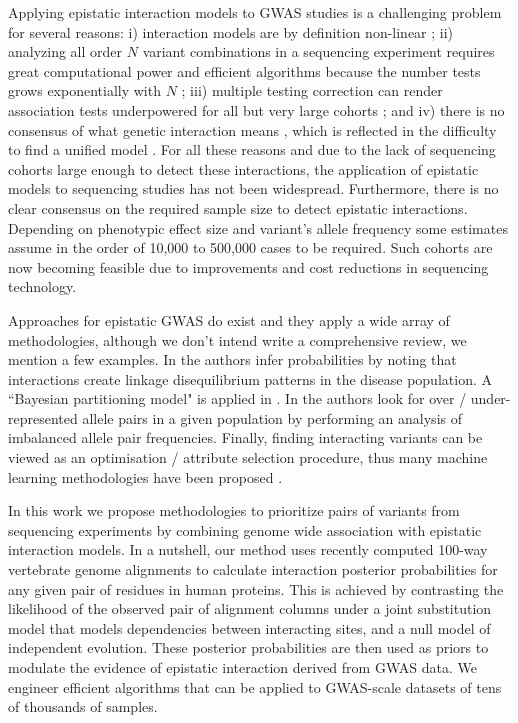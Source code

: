 Applying epistatic interaction models to GWAS studies is a challenging problem for several reasons: i) interaction models are by definition non-linear \cite{gao2010classification}; ii) analyzing all order $N$ variant combinations in a sequencing experiment requires great computational power and efficient algorithms because the number tests grows exponentially with $N$ \cite{phillips2008epistasis}; iii) multiple testing correction can render association tests underpowered for all but very large cohorts \cite{gao2010classification, phillips2008epistasis}; and iv) there is no consensus of what genetic interaction means \cite{mani2008defining}, which is reflected in the difficulty to find a unified model \cite{phillips2008epistasis,mani2008defining}. For all these reasons and due to the lack of sequencing cohorts large enough to detect these interactions, the application of epistatic models to sequencing studies has not been widespread. Furthermore, there is no clear consensus on the required sample size to detect epistatic interactions. Depending on phenotypic effect size and variant's allele frequency some estimates assume in the order of 10,000 to 500,000 cases \cite{jostins2013using} to be required. Such cohorts are now becoming feasible due to improvements and cost reductions in sequencing technology.

Approaches for epistatic GWAS do exist and they apply a wide array of methodologies, although we don't intend write a comprehensive review, we mention a few examples. In \cite{zhao2006test} the authors infer probabilities by noting that interactions create linkage disequilibrium patterns in the disease population. A “Bayesian partitioning model" is applied in \cite{zhang2007bayesian}. In \cite{ackermann2012systematic} the authors look for over / under-represented allele pairs in a given population by performing an analysis of imbalanced allele pair frequencies. Finally, finding interacting variants can be viewed as an optimisation / attribute selection procedure, thus many machine learning methodologies have been proposed \cite{mckinney2006machine}.

In this work we propose methodologies to prioritize pairs of variants from sequencing experiments by combining genome wide association with epistatic interaction models. In a nutshell, our method uses recently computed 100-way vertebrate genome alignments to calculate interaction posterior probabilities for any given pair of residues in human proteins. This is achieved by contrasting the likelihood of the observed pair of alignment columns under a joint substitution model that models dependencies between interacting sites, and a null model of independent evolution.  These posterior probabilities are then used as priors to modulate the evidence of epistatic interaction derived from GWAS data. We engineer efficient algorithms that can be applied to GWAS-scale datasets of tens of thousands of samples.

